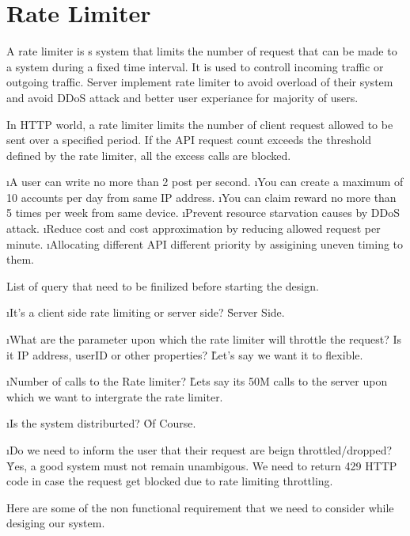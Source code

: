 \chapter{Rate Limiter}

A rate limiter is s system that limits the number of request that can be made to a system during a fixed time interval. It is used to controll incoming traffic or outgoing traffic. Server implement rate limiter to avoid overload of their system and avoid DDoS attack and better user experiance for majority of users.

In HTTP world, a rate limiter limits the number of client request allowed to be sent over a specified period. If the API request count exceeds the threshold defined by the rate limiter, all the excess calls are blocked.

\lstart
    \i A user can write no more than 2 post per second.
    \i You can create a maximum of 10 accounts per day from same IP address.
    \i You can claim reward no more than 5 times per week from same device.
    \i Prevent resource starvation causes by DDoS attack.
    \i Reduce cost and cost approximation by reducing allowed request per minute.
    \i Allocating different API different priority  by assigining uneven timing to them.
\lend




List of query that need to be finilized before starting the design.

\lstart
    \i It's a client side rate limiting or server side?
    \r Server Side.

    \i What are the parameter upon which the rate limiter will throttle the request? Is it IP address, userID or other properties?
    \r Let's say we want it to flexible.

    \i Number of calls to the Rate limiter?
    \r Lets say its 50M calls to the server upon which we want to intergrate the rate limiter.

    \i Is the system distriburted?
    \r Of Course.

    \i Do we need to inform the user that their request are beign throttled/dropped?
    \r Yes, a good system must not remain unambigous. We need to return 429 HTTP code in case the request get blocked due to rate limiting throttling. 
\lend

Here are some of the non functional requirement that we need to consider while desiging our system.

